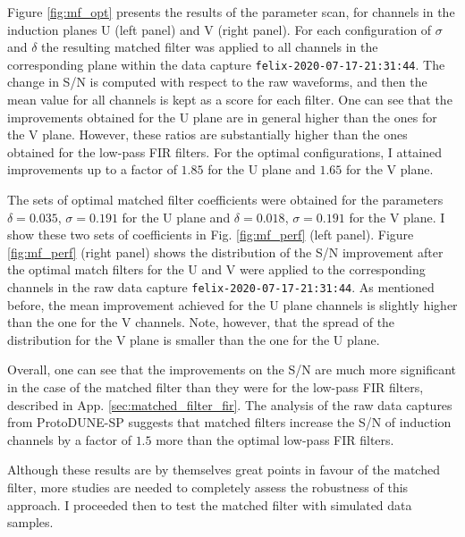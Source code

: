 Figure \ref{fig:mf_opt} presents the results of the parameter scan, for channels in the induction planes U (left panel) and V (right panel). For each configuration of $\sigma$ and $\delta$ the resulting matched filter was applied to all channels in the corresponding plane within the data capture \texttt{felix-2020-07-17-21:31:44}. The change in S/N is computed with respect to the raw waveforms, and then the mean value for all channels is kept as a score for each filter. One can see that the improvements obtained for the U plane are in general higher than the ones for the V plane. However, these ratios are substantially higher than the ones obtained for the low-pass FIR filters. For the optimal configurations, I attained improvements up to a factor of $1.85$ for the U plane and $1.65$ for the V plane.

The sets of optimal matched filter coefficients were obtained for the parameters $\delta = 0.035$, $\sigma = 0.191$ for the U plane and $\delta = 0.018$, $\sigma = 0.191$ for the V plane. I show these two sets of coefficients in Fig. \ref{fig:mf_perf} (left panel). Figure \ref{fig:mf_perf} (right panel) shows the distribution of the S/N improvement after the optimal match filters for the U and V were applied to the corresponding channels in the raw data capture \texttt{felix-2020-07-17-21:31:44}. As mentioned before, the mean improvement achieved for the U plane channels is slightly higher than the one for the V channels. Note, however, that the spread of the distribution for the V plane is smaller than the one for the U plane.

Overall, one can see that the improvements on the S/N are much more significant in the case of the matched filter than they were for the low-pass FIR filters, described in App. \ref{sec:matched_filter_fir}. The analysis of the raw data captures from ProtoDUNE-SP suggests that matched filters increase the S/N of induction channels by a factor of $1.5$ more than the optimal low-pass FIR filters.

Although these results are by themselves great points in favour of the matched filter, more studies are needed to completely assess the robustness of this approach. I proceeded then to test the matched filter with simulated data samples.

